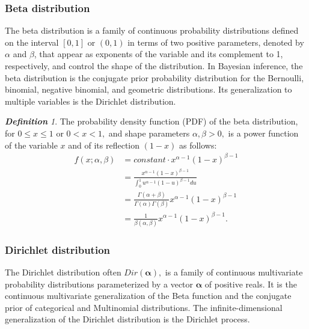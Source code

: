 \documentclass[12pt,oneside,a4paper]{book}
\theoremstyle{definition}
\theoremstyle{remark}
\newtheorem{defn}{\bf Definition}[subsection]
\begin{document}
				\subsubsection{Beta distribution}
					The beta distribution is a family of continuous probability distributions defined on the interval $[0, 1]$ or $(0, 1)$ in terms of two positive parameters, denoted by $\alpha$ and $\beta$, that appear as exponents of the variable and its complement to 1, respectively, and control the shape of the distribution.
					In Bayesian inference, the beta distribution is the conjugate prior probability distribution for the Bernoulli, binomial, negative binomial, and geometric distributions. Its generalization to multiple variables is the Dirichlet distribution.

					\begin{defn}
						The probability density function (PDF) of the beta distribution, for $0 \le x \le 1$ or $0 < x < 1,$ and shape parameters $\alpha, \beta > 0,$ is a power function of the variable $x$ and of its reflection $(1 - x)$ as follows:
						\begin{equation}
							\begin{aligned}
								f(x; \alpha,\beta) &= constant \cdot x^{\alpha-1} (1-x)^{\beta - 1}\\
								&= \frac{x^{\alpha-1} (1-x)^{\beta - 1}}{\int_{0}^{1} u^{\alpha - 1}(1-u)^{\beta - 1} du}\\
								&= \frac{\Gamma (\alpha+\beta)}{\Gamma(\alpha)\Gamma(\beta)}x^{\alpha - 1}(1 - x)^{\beta - 1}\\
								&= \frac{1}{\beta(\alpha,\beta)}x^{\alpha - 1}(1 - x)^{\beta - 1}.
							\end{aligned}
						\end{equation}
					\end{defn}
				\subsubsection{Dirichlet distribution}
					The Dirichlet distribution often $Dir({\boldsymbol {\alpha }}),$ is a family of continuous multivariate probability distributions parameterized by a vector ${\boldsymbol {\alpha }}$ of positive reals.
					It is the continuous multivariate generalization of the Beta function and the conjugate prior of categorical and Multinomial distributions.
					The infinite-dimensional generalization of the Dirichlet distribution is the Dirichlet process.
\end{document}
